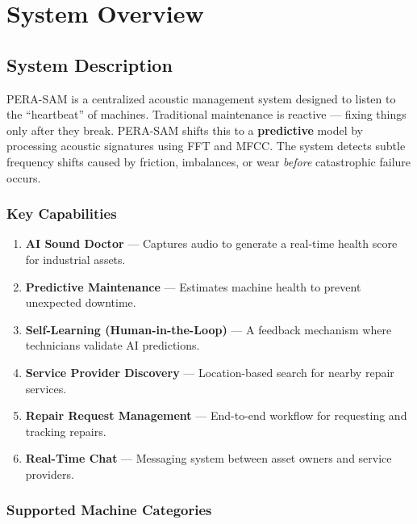 \documentclass[10pt, a4paper, oneside]{report}
\begin{document}
\chapter{System Overview}
\label{ch:system-overview}

\section{System Description}
\label{sec:sys-desc}

PERA-SAM is a centralized acoustic management system designed to listen to the ``heartbeat'' of machines. Traditional maintenance is reactive --- fixing things only after they break. PERA-SAM shifts this to a \textbf{predictive} model by processing acoustic signatures using FFT and MFCC. The system detects subtle frequency shifts caused by friction, imbalances, or wear \textit{before} catastrophic failure occurs.

\subsection*{Key Capabilities}
\begin{enumerate}[leftmargin=*, nosep]
  \item \textbf{AI Sound Doctor} --- Captures audio to generate a real-time health score for industrial assets.
  \item \textbf{Predictive Maintenance} --- Estimates machine health to prevent unexpected downtime.
  \item \textbf{Self-Learning (Human-in-the-Loop)} --- A feedback mechanism where technicians validate AI predictions.
  \item \textbf{Service Provider Discovery} --- Location-based search for nearby repair services.
  \item \textbf{Repair Request Management} --- End-to-end workflow for requesting and tracking repairs.
  \item \textbf{Real-Time Chat} --- Messaging system between asset owners and service providers.
\end{enumerate}

\subsection*{Supported Machine Categories}
\end{document}
